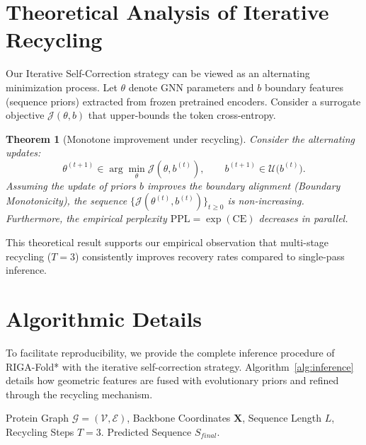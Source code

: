 \documentclass{article}
\theoremstyle{plain}
\newtheorem{theorem}{Theorem}[section]
\theoremstyle{definition}
\theoremstyle{remark}
\begin{document}
{%

\section{Theoretical Analysis of Iterative Recycling}
\label{sec:recycling_theory}

Our Iterative Self-Correction strategy can be viewed as an alternating minimization process.
Let $\theta$ denote GNN parameters and $b$ boundary features (sequence priors) extracted from frozen pretrained encoders. Consider a surrogate objective $\mathcal{J}(\theta,b)$ that upper-bounds the token cross-entropy.

\begin{theorem}[Monotone improvement under recycling]
\label{thm:alt}
Consider the alternating updates:
\begin{equation}
\theta^{(t+1)} \in \arg\min_{\theta} \mathcal{J}(\theta,b^{(t)}), 
\qquad
b^{(t+1)} \in \mathcal{U}\big(b^{(t)}\big).
\end{equation}
Assuming the update of priors $b$ improves the boundary alignment (Boundary Monotonicity), the sequence $\{\mathcal{J}(\theta^{(t)},b^{(t)})\}_{t\ge 0}$ is non-increasing. Furthermore, the empirical perplexity $\mathrm{PPL}=\exp(\mathrm{CE})$ decreases in parallel.
\end{theorem}
This theoretical result supports our empirical observation that multi-stage recycling ($T=3$) consistently improves recovery rates compared to single-pass inference.


\section{Algorithmic Details}
\label{sec:algo}

To facilitate reproducibility, we provide the complete inference procedure of RIGA-Fold* with the iterative self-correction strategy. Algorithm~\ref{alg:inference} details how geometric features are fused with evolutionary priors and refined through the recycling mechanism.

\begin{algorithm}[h]
   \caption{RIGA-Fold* Inference with Cascaded Recycling}
   \label{alg:inference}
\begin{algorithmic}[1]
    Protein Graph $\mathcal{G} = (\mathcal{V}, \mathcal{E})$, Backbone Coordinates $\mathbf{X}$, Sequence Length $L$, Recycling Steps $T=3$.
    Predicted Sequence $S_{final}$.
   

\end{algorithmic}
\end{algorithm}}
\end{document}
